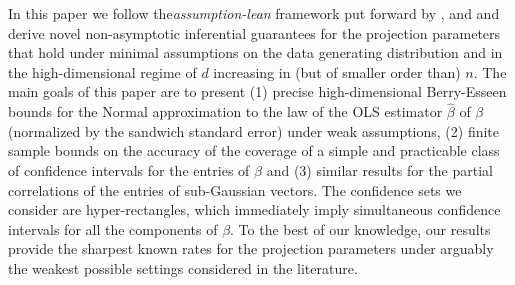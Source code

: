 \documentclass{article}
\let\hat\widehat
\begin{document}
In this paper we follow the{\it assumption-lean} framework put forward by \cite{Buja14}, \cite{kuchibhotla2018valid} and \cite{boot} and derive novel non-asymptotic inferential guarantees for the projection parameters that hold under minimal assumptions on the data generating distribution and in the high-dimensional regime of $d$ increasing in (but of smaller order than) $n$.
The main goals of this paper are to present (1) precise high-dimensional Berry-Esseen bounds
for the Normal approximation to the law of
the OLS estimator
$\hat\beta$ of $\beta$ (normalized by the sandwich standard error) under weak assumptions,
(2) finite sample bounds on the
accuracy of the coverage of a simple and practicable class of confidence intervals for the entries of
$\beta$
and
(3) similar results for the
partial correlations of the entries of sub-Gaussian vectors.
The confidence sets we consider are
hyper-rectangles, which
immediately imply
simultaneous
confidence intervals
for all the components of $\beta$.
To the best of our knowledge, our results provide the sharpest known rates for the projection parameters under arguably the weakest possible settings considered in the
literature.
\end{document}
